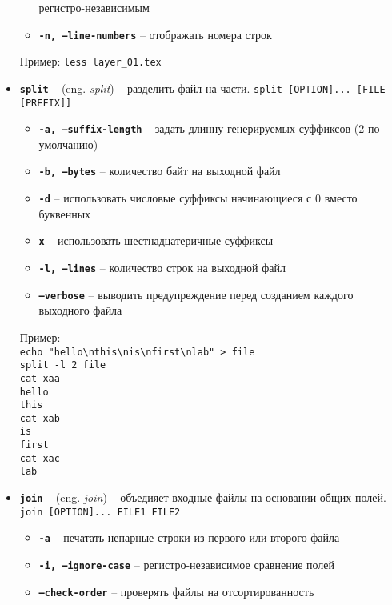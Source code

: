 \documentclass[12pt, a4paper]{article}
\begin{document}
\begin{itemize}
\begin{itemize}
      регистро-независимым
    \item \textbf{\texttt{-n, --line-numbers}} -- отображать номера строк
  \end{itemize}
  Пример: \texttt{less layer\_01.tex}
  \item \textbf{\texttt{split}} -- (eng. \textit{split}) -- разделить файл на
    части. \texttt{split [OPTION]... [FILE [PREFIX]]}
  \begin{itemize}
    \item \textbf{\texttt{-a, --suffix-length}} -- задать длинну генерируемых
      суффиксов (2 по умолчанию)
    \item \textbf{\texttt{-b, --bytes}} -- количество байт на выходной файл
    \item \textbf{\texttt{-d}} -- использовать числовые суффиксы начинающиеся
      с 0 вместо буквенных
    \item \textbf{\texttt{x}} -- использовать шестнадцатеричные суффиксы
    \item \textbf{\texttt{-l, --lines}} -- количество строк на выходной файл
    \item \textbf{\texttt{--verbose}} -- выводить предупреждение перед созданием
      каждого выходного файла
  \end{itemize}
  Пример:\\
  \texttt{echo "hello\backslash nthis\backslash nis\backslash nfirst\backslash nlab" > file}\\
  \texttt{split -l 2 file}\\
  \texttt{cat xaa}\\
  \texttt{hello}\\
  \texttt{this}\\
  \texttt{cat xab}\\
  \texttt{is}\\
  \texttt{first}\\
  \texttt{cat xac}\\
  \texttt{lab}\\
  \item \textbf{\texttt{join}} -- (eng. \textit{join}) -- объедияет входные
    файлы на основании общих полей. \texttt{join [OPTION]... FILE1 FILE2}
  \begin{itemize}
    \item \textbf{\texttt{-a}} -- печатать непарные строки из первого или
      второго файла
    \item \textbf{\texttt{-i, --ignore-case}} -- регистро-независимое сравнение
      полей
    \item \textbf{\texttt{--check-order}} -- проверять файлы на отсортированность

\end{itemize}
\end{itemize}
\end{document}
